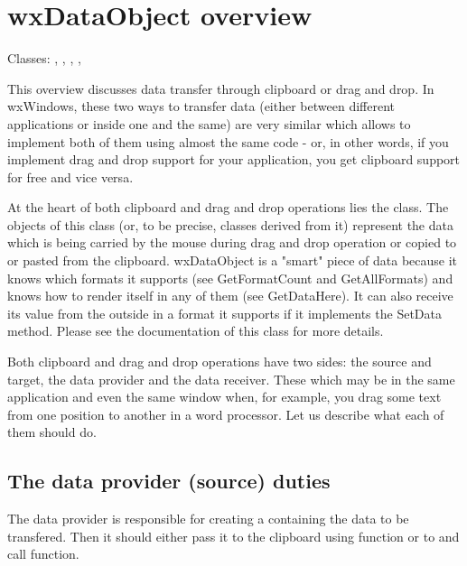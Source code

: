 \section{wxDataObject overview}\label{wxdataobjectoverview}

Classes: ,
 ,
 ,
 ,

This overview discusses data transfer through clipboard or drag and drop. In
wxWindows, these two ways to transfer data (either between different
applications or inside one and the same) are very similar which allows to
implement both of them using almost the same code - or, in other
words, if you implement drag and drop support for your application, you get
clipboard support for free and vice versa.

At the heart of both clipboard and drag and drop operations lies the 
 class. The objects of this class (or, to
be precise, classes derived from it) represent the data which is being carried
by the mouse during drag and drop operation or copied to or pasted from the
clipboard. wxDataObject is a "smart" piece of data because it knows which
formats it supports (see GetFormatCount and GetAllFormats) and knows how to
render itself in any of them (see GetDataHere). It can also receive its value
from the outside in a format it supports if it implements the SetData method.
Please see the documentation of this class for more details.

Both clipboard and drag and drop operations have two sides: the source and
target, the data provider and the data receiver. These which may be in the same
application and even the same window when, for example, you drag some text from
one position to another in a word processor. Let us describe what each of them
should do.

\subsection{The data provider (source) duties}\label{wxdataobjectsource}

The data provider is responsible for creating a 
 containing the data to be
transfered. Then it should either pass it to the clipboard using 
 function or to 
 and call 
 function.

